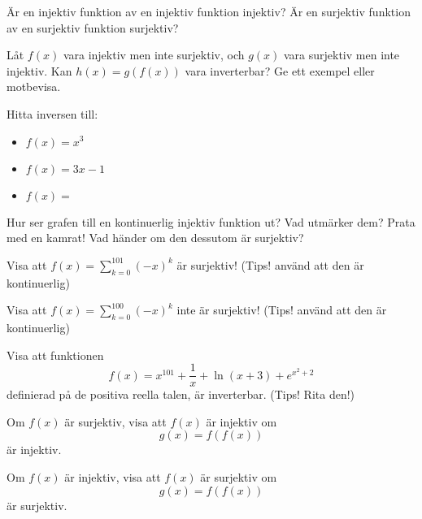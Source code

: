 \begin{problem}
	Är en injektiv funktion av en injektiv funktion injektiv? Är en surjektiv funktion av en surjektiv funktion surjektiv?
\end{problem}

\begin{problem}
	Låt \(f(x)\) vara injektiv men inte surjektiv, och \(g(x)\) vara surjektiv men inte injektiv. Kan \(h(x) = g(f(x))\) vara inverterbar? Ge ett exempel eller motbevisa.
\end{problem}

\begin{problem}
	Hitta inversen till:
	\begin{itemize}
		\item \(f(x) = x^3\) 
		\item \(f(x) = 3x - 1\) 
		\item \(f(x) =\)  %
	\end{itemize}
\end{problem}

\begin{problem}
	Hur ser grafen till en kontinuerlig injektiv funktion ut? Vad utmärker dem? Prata med en kamrat! Vad händer om den dessutom är surjektiv?
\end{problem}


\begin{problem}
	Visa att \(f(x) = \sum_{k=0} ^{101} (-x)^k\) är surjektiv! (Tips! använd att den är kontinuerlig)
\end{problem}

\begin{problem}
	Visa att \(f(x) = \sum_{k=0} ^{100} (-x)^k\) inte är surjektiv! (Tips! använd att den är kontinuerlig)
\end{problem}

\begin{problem}
	Visa att funktionen
	\[
		f(x) = x^{101} + \frac{1}{x} + \ln(x+3) + e^{x^2 + 2}
	\]
	definierad på de positiva reella talen, är inverterbar. (Tips! Rita den!)
\end{problem}

\begin{problem}
	Om \(f(x)\) är surjektiv, visa att \(f(x)\) är injektiv om
	\[
		g(x) = f(f(x))
	\]
	är injektiv.
\end{problem}

\begin{problem}
	Om \(f(x)\) är injektiv, visa att \(f(x)\) är surjektiv om
	\[
		g(x) = f(f(x))
	\]
	är surjektiv.
\end{problem}






